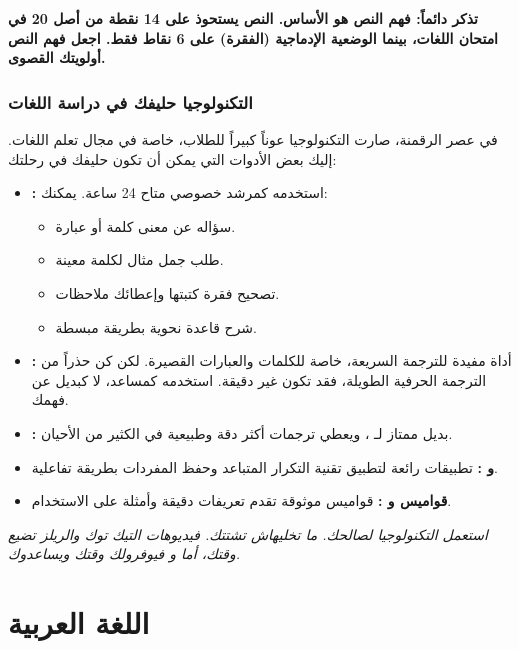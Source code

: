 \documentclass[12pt,a4paper]{book}
\newcommand{\quoteAr}[1]{%
	\begin{myquote}
		\itshape #1
	\end{myquote}
}
\newcommand{\importantAr}[1]{%
	\begin{important}
		\bfseries #1
	\end{important}
}
\begin{document}
	\importantAr{تذكر دائماً: فهم النص هو الأساس. النص يستحوذ على 14 نقطة من أصل 20 في امتحان اللغات، بينما الوضعية الإدماجية (الفقرة) على 6 نقاط فقط. اجعل فهم النص أولويتك القصوى.}
	
	\subsubsection{التكنولوجيا حليفك في دراسة اللغات}
	
	في عصر الرقمنة، صارت التكنولوجيا عوناً كبيراً للطلاب، خاصة في مجال تعلم اللغات. إليك بعض الأدوات التي يمكن أن تكون حليفك في رحلتك:
	
	\begin{itemize}
		\item \textbf{:} استخدمه كمرشد خصوصي متاح 24 ساعة. يمكنك:
		\begin{itemize}
			\item سؤاله عن معنى كلمة أو عبارة.
			\item طلب جمل مثال لكلمة معينة.
			\item تصحيح فقرة كتبتها وإعطائك ملاحظات.
			\item شرح قاعدة نحوية بطريقة مبسطة.
		\end{itemize}
		\item \textbf{:} أداة مفيدة للترجمة السريعة، خاصة للكلمات والعبارات القصيرة. لكن كن حذراً من الترجمة الحرفية الطويلة، فقد تكون غير دقيقة. استخدمه كمساعد، لا كبديل عن فهمك.
		\item \textbf{:} بديل ممتاز لـ ، ويعطي ترجمات أكثر دقة وطبيعية في الكثير من الأحيان.
		\item \textbf{ و :} تطبيقات رائعة لتطبيق تقنية التكرار المتباعد وحفظ المفردات بطريقة تفاعلية.
		\item \textbf{قواميس  و :} قواميس موثوقة تقدم تعريفات دقيقة وأمثلة على الاستخدام.
	\end{itemize}
	
	\quoteAr{استعمل التكنولوجيا لصالحك. ما تخليهاش تشتتك. فيديوهات التيك توك والريلز تضيع وقتك، أما \LR{ChatGPT} و \LR{Anki} فيوفرولك وقتك ويساعدوك.}
	
	
	
	\section{اللغة العربية}
	
\end{document}
